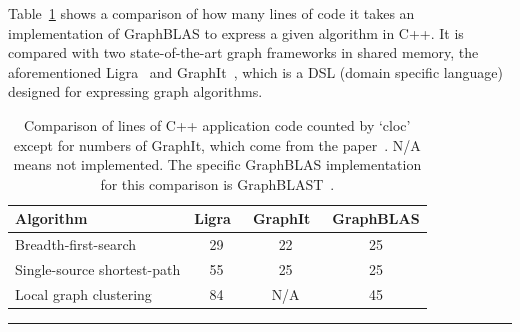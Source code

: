 Table~\ref{tab:loc} shows a comparison of how many lines of code it takes an implementation of GraphBLAS to express a given algorithm in C++. It is compared with two state-of-the-art graph frameworks in shared memory, the aforementioned Ligra~\cite{Shun:2013:Ligra} and GraphIt~\cite{Zhang:2018:GHP}, which is a DSL (domain specific language) designed for expressing graph algorithms.

\begin{table}[t]
	\centering
	\begin{tabular}{lccc}
		\toprule
		Algorithm      & Ligra~\cite{Shun:2013:Ligra} & GraphIt~\cite{Zhang:2018:GHP} & GraphBLAS  \\ \midrule
		Breadth-first-search & 29 & 22  & 25 \\
		Single-source shortest-path   & 55 & 25 & 25 \\
		Local graph clustering  & 84 & N/A  & 45 \\ \bottomrule
	\end{tabular}
	\caption{Comparison of lines of C++ application code counted by `cloc' except for numbers of GraphIt, which come from the paper~\cite{Zhang:2018:GHP}. N/A means not implemented. The specific GraphBLAS implementation for this comparison is GraphBLAST~\cite{Yang:2019:GBL}.\label{tab:loc}}
\hrule
\end{table}
